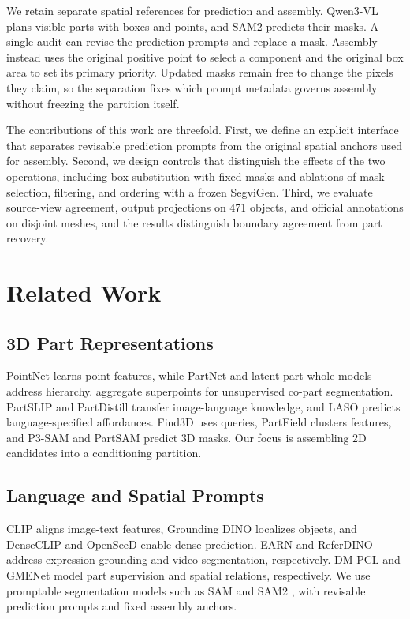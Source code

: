 \documentclass[pdflatex,sn-mathphys-ay]{sn-jnl}
\begin{document}
We retain separate spatial references for prediction and assembly. Qwen3-VL \citep{bai2025qwen3vl} plans visible parts with boxes and points, and SAM2 \citep{ravi2024sam2} predicts their masks. A single audit can revise the prediction prompts and replace a mask. Assembly instead uses the original positive point to select a component and the original box area to set its primary priority. Updated masks remain free to change the pixels they claim, so the separation fixes which prompt metadata governs assembly without freezing the partition itself.

The contributions of this work are threefold. First, we define an explicit interface that separates revisable prediction prompts from the original spatial anchors used for assembly. Second, we design controls that distinguish the effects of the two operations, including box substitution with fixed masks and ablations of mask selection, filtering, and ordering with a frozen SegviGen. Third, we evaluate source-view agreement, output projections on 471 objects, and official annotations on disjoint meshes, and the results distinguish boundary agreement from part recovery.

\section{Related Work}\label{sec:related}

\subsection{3D Part Representations}
PointNet \citep{qi2017pointnet} learns point features, while PartNet \citep{mo2019partnet} and latent part-whole models \citep{gao2025latent} address hierarchy. \citet{umam2024copart} aggregate superpoints for unsupervised co-part segmentation. PartSLIP \citep{liu2023partslip} and PartDistill \citep{umam2024partdistill} transfer image-language knowledge, and LASO \citep{li2024laso} predicts language-specified affordances. Find3D \citep{ma2024find3d} uses queries, PartField \citep{liu2025partfield} clusters features, and P3-SAM \citep{ma2025p3sam} and PartSAM \citep{zhu2025partsam} predict 3D masks. Our focus is assembling 2D candidates into a conditioning partition.

\subsection{Language and Spatial Prompts}
CLIP \citep{radford2021clip} aligns image-text features, Grounding DINO \citep{liu2024groundingdino} localizes objects, and DenseCLIP \citep{rao2022denseclip} and OpenSeeD \citep{zhang2023openseed} enable dense prediction. EARN \citep{liu2023earn} and ReferDINO \citep{liang2025referdino} address expression grounding and video segmentation, respectively. DM-PCL \citep{han2025dmpcl} and GMENet \citep{michieli2022gmenet} model part supervision and spatial relations, respectively. We use promptable segmentation models such as SAM \citep{kirillov2023sam} and SAM2 \citep{ravi2024sam2}, with revisable prediction prompts and fixed assembly anchors.
\end{document}
